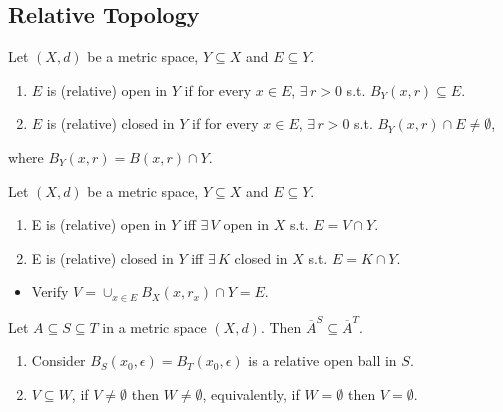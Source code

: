 \documentclass[12pt]{article}
\begin{document}
\subsection*{Relative Topology}

\begin{definition}
    Let $(X,d)$ be a metric space, $Y\subseteq X$ and $E\subseteq Y$.
    \begin{enumerate}
        \item $E$ is (relative) open in $Y$ if for every $x\in E$, $\exists\, r>0$ s.t. $B_Y(x,r)\subseteq E$.
        \item $E$ is (relative) closed in $Y$ if for every $x\in E$, $\exists\, r>0$ s.t. $B_Y(x,r)\cap E \neq \emptyset$,
    \end{enumerate}
    where $B_Y(x,r) = B(x,r)\cap Y$.
\end{definition}

\begin{theorem}
     Let $(X,d)$ be a metric space, $Y\subseteq X$ and $E\subseteq Y$.
    \begin{enumerate}
        \item E is (relative) open in $Y$ iff $\exists\, V$ open in $X$ s.t. $E = V\cap Y$.
        \item E is (relative) closed in $Y$ iff $\exists\, K$ closed in $X$ s.t. $E = K\cap Y$.
    \end{enumerate}
\end{theorem}

\begin{pfbox}
\begin{itemize}
    \item Verify $V=\cup_{x\in E}B_X(x,r_x)\cap Y=E.$
\end{itemize}
\end{pfbox}

\begin{theorem}
    Let $A\subseteq S\subseteq T$ in a metric space $(X,d)$.
    Then $\overline{A}^S\subseteq \overline{A}^T$.
\end{theorem}

\begin{pfbox}
    \begin{enumerate}
        \item Consider $B_S(x_0,\epsilon)=B_T(x_0,\epsilon)$ is a relative open ball in $S$.
        \item $V\subseteq W$, if $V\neq\emptyset$ then $W\neq\emptyset$, equivalently, if $W=\emptyset$ then $V=\emptyset$.
    \end{enumerate}
\end{pfbox}
\end{document}
